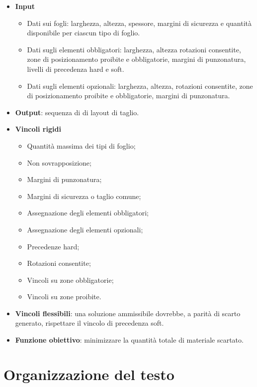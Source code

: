 \begin{itemize}
    \item \textbf{Input}
    \begin{itemize}
        \item Dati sui fogli: larghezza, altezza, spessore, margini di sicurezza e quantità disponibile per ciascun tipo di foglio.
        \item Dati sugli elementi obbligatori: larghezza, altezza rotazioni consentite, zone di posizionamento proibite e obbligatorie, margini di punzonatura, livelli di precedenza hard e soft.
        \item Dati sugli elementi opzionali: larghezza, altezza, rotazioni consentite, zone di posizionamento proibite e obbligatorie, margini di punzonatura.
    \end{itemize}
    \item \textbf{Output}: sequenza di di layout di taglio.
    \item \textbf{Vincoli rigidi}
    \begin{itemize}
        \item Quantità massima dei tipi di foglio;
        \item Non sovrapposizione;
        \item Margini di punzonatura;
        \item Margini di sicurezza o taglio comune;
        \item Assegnazione degli elementi obbligatori;
        \item Assegnazione degli elementi opzionali;
        \item Precedenze hard;
        \item Rotazioni consentite;
        \item Vincoli su zone obbligatorie;
        \item Vincoli su zone proibite.
    \end{itemize}
    \item \textbf{Vincoli flessibili}: una soluzione ammissibile dovrebbe, a parità di scarto generato, rispettare il vincolo di precedenza soft.
    \item \textbf{Funzione obiettivo}: minimizzare la quantità totale di materiale scartato.
\end{itemize}


\section{Organizzazione del testo}

